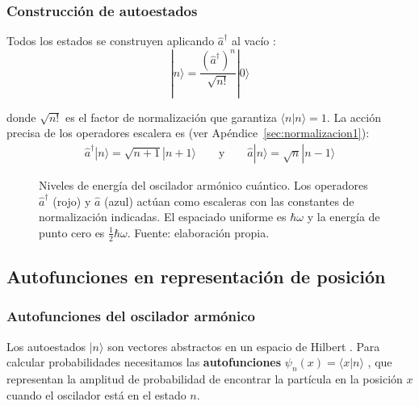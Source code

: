 \subsubsection{Construcción de autoestados}

Todos los estados se construyen aplicando $\hat{a}^\dagger$ al vacío \citep{dirac1930}:
\begin{equation}
	|n\rangle = \frac{(\hat{a}^\dagger)^n}{\sqrt{n!}}|0\rangle
\end{equation}

donde $\sqrt{n!}$ es el factor de normalización que garantiza $\langle n | n \rangle = 1$. La acción precisa de los operadores escalera es (ver Apéndice~\ref{sec:normalizacion1}):
\begin{align}
	\hat{a}^\dagger|n\rangle = \sqrt{n+1}|n+1\rangle \qquad \text{y} \qquad
	\hat{a}|n\rangle = \sqrt{n}|n-1\rangle
\end{align}

\begin{figure}[h!]
	\centering
	
	\caption[Niveles de energía del oscilador armónico cuántico.]{Niveles de energía del oscilador armónico cuántico. Los operadores $\hat{a}^\dagger$ (rojo) y $\hat{a}$ (azul) actúan como escaleras con las constantes de normalización indicadas. El espaciado uniforme es $\hbar\omega$ y la energía de punto cero \citep{planck1911} es $\frac{1}{2}\hbar\omega$. Fuente: elaboración propia.}
	\label{fig:niveles}
\end{figure}

\subsection{Autofunciones en representación de posición}

\subsubsection{Autofunciones del oscilador armónico}

Los autoestados $|n\rangle$ son vectores abstractos en un espacio de Hilbert \citep{vonneumann1932}. Para calcular probabilidades necesitamos las \textbf{autofunciones} $\psi_n(x) = \langle x | n \rangle$ \citep{dirac1930}, que representan la amplitud de probabilidad \citep{born1926} de encontrar la partícula en la posición $x$ cuando el oscilador está en el estado $n$.

